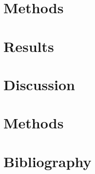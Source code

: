 \section*{Methods}\label{s:methods}



\section*{Results}\label{s:results}


\section*{Discussion}\label{s:discussion}

\section*{Methods}\label{s:methods}


\section*{Bibliography}

